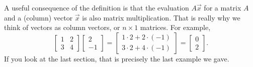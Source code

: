 \documentclass{ximera}
\begin{document}
A useful consequence of the definition is that the evaluation $A \vec{x}$ for a matrix $A$ and a (column) vector $\vec{x}$ is also matrix multiplication. That is really why we think of vectors as column vectors, or $n \times 1$ matrices. For example,
\begin{equation*}
    \begin{bmatrix}
        1 & 2 \\ 
        3 & 4
    \end{bmatrix}
    \begin{bmatrix}
        2 \\ 
        -1
    \end{bmatrix} 
    =
    \begin{bmatrix}
        1 \cdot 2 + 2 \cdot (-1) \\
        3 \cdot 2 + 4 \cdot (-1)
    \end{bmatrix}
    =
    \begin{bmatrix}
        0 \\ 
        2
    \end{bmatrix}  .
\end{equation*}
If you look at the last section, that is precisely the last example we gave.
\end{document}
